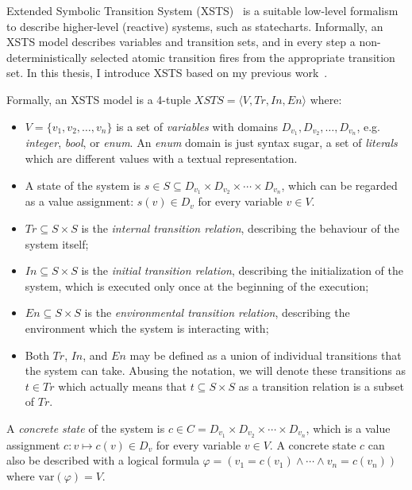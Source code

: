Extended Symbolic Transition System (XSTS)~\cite{XSTS} is a suitable low-level formalism to describe higher-level (reactive) systems, such as statecharts. Informally, an XSTS model describes variables and transition sets, and in every step a non-deterministically selected atomic transition fires from the appropriate transition set. In this thesis, I introduce XSTS based on my previous work~\cite{xsts-split}.

\begin{definition}
Formally, an XSTS model is a 4-tuple $XSTS = \langle V, Tr, In, En \rangle$ where:
\begin{itemize}
    \item $V = \{ v_1, v_2, \ldots, v_n  \}$ is a set of \textit{variables} with domains $D_{v_1}, D_{v_2}, \ldots, D_{v_n}$, e.g. \emph{integer}, \emph{bool}, or \emph{enum}. An \emph{enum} domain is just syntax sugar, a set of \emph{literals} which are different values with a textual representation.
    \item A state of the system is $s \in S \subseteq D_{v_1} \times D_{v_2} \times \cdots \times D_{v_n}$, which can be regarded as a value assignment: $s(v) \in D_v$ for every variable $v \in V$.
    \item $Tr \subseteq S \times S$ is the \textit{internal transition relation}, describing the behaviour of the system itself;
    \item $In \subseteq S \times S$ is the \textit{initial transition relation}, describing the initialization of the system, which is executed only once at the beginning of the execution;
    \item $En \subseteq S \times S$ is the \textit{environmental transition relation}, describing the environment which the system is interacting with;
    \item Both $Tr$, $In$, and $En$ may be defined as a union of individual transitions that the system can take. Abusing the notation, we will denote these transitions as $t \in Tr$ which actually means that $t \subseteq S \times S$ as a transition relation is a subset of $Tr$.
\end{itemize}
\end{definition}

A \textit{concrete state} of the system is $c \in C = D_{v_1} \times D_{v_2} \times \cdots \times D_{v_n}$, which is a value assignment $c: v \mapsto c(v) \in D_v$ for every variable $v \in V$. A concrete state $c$ can also be described with a logical formula $\varphi = (v_1 = c(v_1) \wedge \cdots \wedge v_n = c(v_n))$ where $\mathrm{var}(\varphi) = V$.

